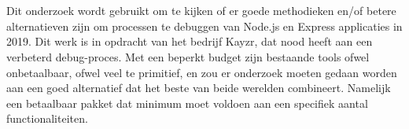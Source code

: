 
%
%

%



\chapter*{}

Dit onderzoek wordt gebruikt om te kijken of er goede methodieken en/of betere alternatieven zijn om processen te debuggen van Node.js en Express applicaties in 2019. Dit werk is in opdracht van het bedrijf Kayzr, dat nood heeft aan een verbeterd debug-proces. Met een beperkt budget zijn bestaande tools ofwel onbetaalbaar, ofwel veel te primitief, en zou er onderzoek moeten gedaan worden aan een goed alternatief dat het beste van beide werelden combineert. Namelijk een betaalbaar pakket dat minimum moet voldoen aan een specifiek aantal functionaliteiten.

